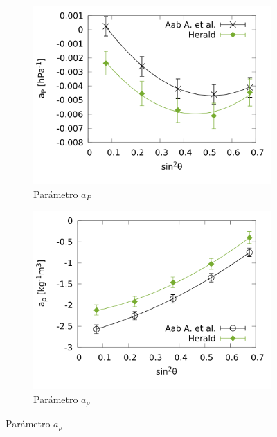 				\begin{figure}[H]
					\begin{subfigure}[b]{0.5\textwidth}
					\includegraphics[width=\linewidth]{params/ap_2017_above_1EeV.png}
					\caption{Parámetro $a_P$ }
					\label{fig:ap_2017_1EeV}
					\end{subfigure}%
					\hspace{\fill}
					\begin{subfigure}[b]{0.5\textwidth}
					\includegraphics[width=\linewidth]{params/arho_2017_above_1EeV.png}
					\caption{Parámetro $a_{\rho}$ }
					\label{fig:arho_2017_1EeV}
					\end{subfigure}%
					\hspace{\fill}

\end{figure}
